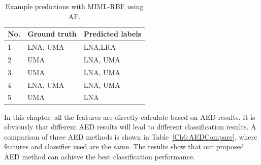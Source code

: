 \begin{table}[htb!]
\centering
\caption{Example predictions with MIML-RBF using AF.}
\label{tab:prediction}
\begin{tabular}{lll}
\hline\hline
{\bf No.} &{\bf Ground truth} & {\bf Predicted labels} \\ \hline
1&LNA, UMA                & LNA,LRA                    \\ 
2&UMA      &     LNA, UMA      \\ 
3& UMA           & LNA, UMA               \\ 
4&LNA, UMA      & LNA, UMA     \\ 
5&UMA      & LNA            \\ \hline\hline
\end{tabular}
\end{table}


In this chapter, all the features are directly calculate based on AED results.
It is obviously that different AED results will lead to different classification results. 
A comparison of three AED methods is shown in Table~\ref{Ch6:AEDCompare}, where features and classifier used are the same. The results show that our proposed AED method can achieve the best classification performance.




